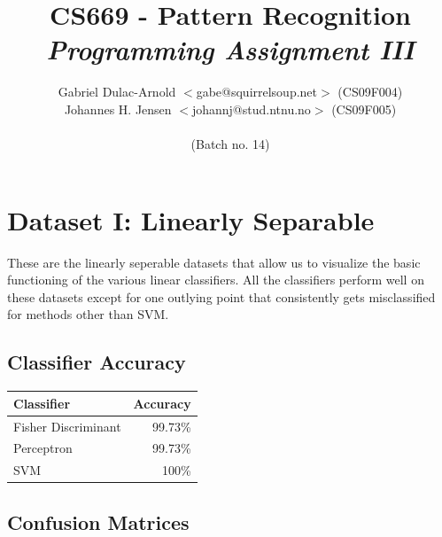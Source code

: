 \documentclass[a4paper]{article}
\author{Gabriel Dulac-Arnold $<$gabe@squirrelsoup.net$>$ (CS09F004) \\
Johannes H. Jensen $<$johannj@stud.ntnu.no$>$ (CS09F005) \\
\\
(Batch no. 14)}
\title{CS669 - Pattern Recognition\\
\emph{Programming Assignment III}}
\begin{document}
\setlength{\parskip}{2ex}
\setlength{\tabcolsep}{8pt}
\renewcommand\arraystretch{1.5}
\maketitle

\section{Dataset I: Linearly Separable}

These are the linearly seperable datasets that allow us to visualize the basic functioning of the various linear classifiers.
All the classifiers perform well on these datasets except for one outlying point that consistently gets misclassified for methods other than SVM.

\subsection{Classifier Accuracy}

\begin{tabular}{ | l | r | }
\hline
\textbf{Classifier} & \textbf{Accuracy} \\
\hline
Fisher Discriminant  &   99.73\% \\
\hline
Perceptron          &   99.73\% \\
\hline
SVM                 &   100\%   \\
\hline
\end{tabular}


\subsection{Confusion Matrices}
\end{document}
